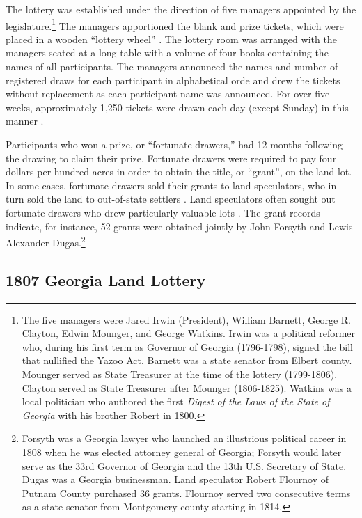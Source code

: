 The lottery was established under the direction of five managers appointed by the legislature.\footnote{The five managers were Jared Irwin (President), William Barnett, George R. Clayton, Edwin Mounger, and George Watkins. Irwin was a political reformer who, during his first term as Governor of Georgia (1796-1798), signed the bill that nullified the Yazoo Act. Barnett was a state senator from Elbert county. Mounger served as State Treasurer at the time of the lottery (1799-1806). Clayton served as State Treasurer after Mounger (1806-1825). Watkins was a local politician who authored the first \textit{Digest of the Laws of the State of Georgia} with his brother Robert in 1800.} The managers apportioned the blank and prize tickets, which were placed in a wooden ``lottery wheel'' \citep{cadle1991}. The lottery room was arranged with the managers seated at a long table with a volume of four books containing the names of all participants. The managers announced the names and number of registered draws for each participant in alphabetical orde and drew the tickets without replacement as each participant name was announced. For over five weeks, approximately 1,250 tickets were drawn each day (except Sunday) in this manner \citep{graham2004}.

Participants who won a prize, or ``fortunate drawers,'' had 12 months following the drawing to claim their prize. Fortunate drawers were required to pay four dollars per hundred acres in order to obtain the title, or ``grant'', on the land lot. In some cases, fortunate drawers sold their grants to land speculators, who in turn sold the land to out-of-state settlers \citep{davis1981}. Land speculators often sought out fortunate drawers who drew particularly valuable lots \citep{cadle1991}. The grant records indicate, for instance, 52 grants were obtained jointly by John Forsyth and Lewis Alexander Dugas.\footnote{Forsyth was a Georgia lawyer who launched an illustrious political career in 1808 when he was elected attorney general of Georgia; Forsyth would later serve as the 33rd Governor of Georgia and the 13th U.S. Secretary of State. Dugas was a Georgia businessman. Land speculator Robert Flournoy of Putnam County purchased 36 grants. Flournoy served two consecutive terms as a state senator from Montgomery county starting in 1814.}

\subsection{1807 Georgia Land Lottery}

